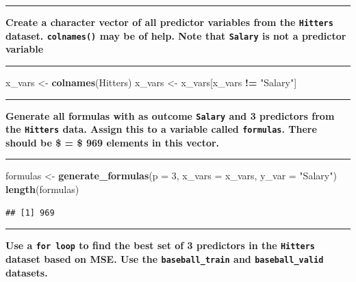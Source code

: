 \documentclass[12pt,]{article}
\newenvironment{Shaded}{\begin{snugshade}}{\end{snugshade}}
\newcommand{\DataTypeTok}[1]{\textcolor[rgb]{0.13,0.29,0.53}{#1}}
\newcommand{\DecValTok}[1]{\textcolor[rgb]{0.00,0.00,0.81}{#1}}
\newcommand{\KeywordTok}[1]{\textcolor[rgb]{0.13,0.29,0.53}{\textbf{#1}}}
\newcommand{\NormalTok}[1]{#1}
\newcommand{\OperatorTok}[1]{\textcolor[rgb]{0.81,0.36,0.00}{\textbf{#1}}}
\newcommand{\StringTok}[1]{\textcolor[rgb]{0.31,0.60,0.02}{#1}}
\begin{document}
\begin{center}\rule{0.5\linewidth}{\linethickness}\end{center}

\textbf{Create a character vector of all predictor variables from the
\texttt{Hitters} dataset. \texttt{colnames()} may be of help. Note that
\texttt{Salary} is not a predictor variable}

\begin{center}\rule{0.5\linewidth}{\linethickness}\end{center}

\begin{Shaded}
\begin{Highlighting}[]
\NormalTok{x_vars <-}\StringTok{ }\KeywordTok{colnames}\NormalTok{(Hitters)}
\NormalTok{x_vars <-}\StringTok{ }\NormalTok{x_vars[x_vars }\OperatorTok{!=}\StringTok{ "Salary"}\NormalTok{]}
\end{Highlighting}
\end{Shaded}

\begin{center}\rule{0.5\linewidth}{\linethickness}\end{center}

\textbf{Generate all formulas with as outcome \texttt{Salary} and 3
predictors from the \texttt{Hitters} data. Assign this to a variable
called \texttt{formulas}. There should be \$ = \$ 969
elements in this vector.}

\begin{center}\rule{0.5\linewidth}{\linethickness}\end{center}

\begin{Shaded}
\begin{Highlighting}[]
\NormalTok{formulas <-}\StringTok{ }\KeywordTok{generate_formulas}\NormalTok{(}\DataTypeTok{p =} \DecValTok{3}\NormalTok{, }\DataTypeTok{x_vars =}\NormalTok{ x_vars, }\DataTypeTok{y_var =} \StringTok{"Salary"}\NormalTok{)}
\KeywordTok{length}\NormalTok{(formulas)}
\end{Highlighting}
\end{Shaded}

\begin{verbatim}
## [1] 969
\end{verbatim}

\begin{center}\rule{0.5\linewidth}{\linethickness}\end{center}

\textbf{Use a \texttt{for\ loop} to find the best set of 3 predictors in
the \texttt{Hitters} dataset based on MSE. Use the
\texttt{baseball\_train} and \texttt{baseball\_valid} datasets.}
\end{document}
